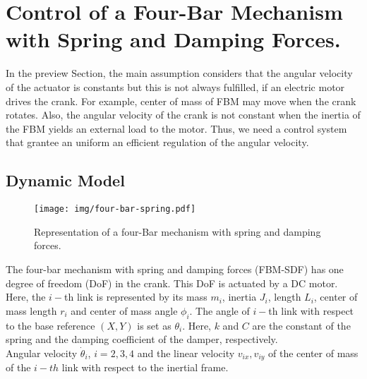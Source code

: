 \documentclass[12pt,letterpape]{article}
\begin{document}
\section{Control of a Four-Bar Mechanism with Spring and Damping Forces.} %
\label{sec:control}

In the preview Section, the main assumption considers that the angular velocity
of the actuator is constants but this is not always fulfilled, if an electric motor
drives the crank. For example, center of mass of FBM may move when the crank rotates.
Also, the angular velocity of the crank is not constant when the inertia of the 
FBM yields an external load to the motor. Thus, we need a control system that grantee 
an uniform an efficient regulation of the angular velocity.

\subsection{Dynamic Model} %
\label{sub:dynamic_model}

\begin{figure}[!ht]
	\centering
	\texttt{[image: img/four-bar-spring.pdf]}
	\caption{Representation of a four-Bar mechanism with spring and damping forces.}
\end{figure}

The four-bar mechanism with spring and damping forces (FBM-SDF) has one degree of
freedom (DoF) in the crank. This DoF is actuated by a DC motor. Here, the $i-$th
link is represented by its mass $m_i$, inertia $J_i$, length $L_i$, center of mass
length $r_i$ and center of mass angle $\phi_i$. The angle of $i-$th link with
respect to the base reference $(X, Y)$ is set as $\theta_i$. Here, $k$ and $C$
are the constant of the spring and the damping coefficient of the damper, respectively.\\

Angular velocity $\dot{\theta}_i$, $ i = 2,3,4$ and the linear velocity $v_{ix},v_{iy}$
of the center of mass of the $i-th$ link with respect to the inertial frame.
\end{document}
